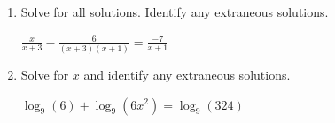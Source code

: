 \documentclass[11pt]{article}
\begin{document}
\begin{enumerate}
{{ (No extraneous solutions) 

}
}

\newpage

% 

\item %
\providecommand{\stxKnowl}{}\renewcommand{\stxKnowl}[1]{#1}
\providecommand{\stxOuttro}{}\renewcommand{\stxOuttro}[1]{#1}
\providecommand{\stxTitle}{}\renewcommand{\stxTitle}[1]{#1}
\renewcommand{\stxOuttro}[1]{}
\stxKnowl{
 Solve for all solutions. Identify any extraneous solutions. 

 \(\displaystyle \frac{x}{x + 3} - \frac{6}{(x + 3)(x + 1)} = \frac{-7}{x + 1}\) 

\stxOuttro{
SOLUTION

 \(x(x + 1) - 6 = -7(x + 3)\) 

 \(x^{2} + 8 \, x + 15 = 0\) 

 \((x + 3)(x + 5) = 0\) 

 \(x = -5, \quad x = -3\) 

 \(x = -3 \implies \text{Extraneous}\) 

 \(\boxed{x = -5}\) 

}
}

\newpage

% 

\item %
\providecommand{\stxKnowl}{}\renewcommand{\stxKnowl}[1]{#1}
\providecommand{\stxOuttro}{}\renewcommand{\stxOuttro}[1]{#1}
\providecommand{\stxTitle}{}\renewcommand{\stxTitle}[1]{#1}
\renewcommand{\stxOuttro}[1]{}
\stxKnowl{
Solve for \(x\) and identify any extraneous solutions.

\(\log_{9}(6) + \log_{9}(6x^2) = \log_{9}(324)\)

\stxOuttro{
Solution

\[\begin{aligned} \log_{9}(6 \cdot 6x^2) &= \log_{9}(324) \\ 36x^2 &= 324 \\ x^2 &= 9 \\ x &= \pm 3 \end{aligned}\]

 Both solutions are valid since substituting either into the original equation results in strictly positive arguments for the logarithms. 

solutions: \(\boxed{ x = \pm 3 }\)

}}
\end{enumerate}
\end{document}
